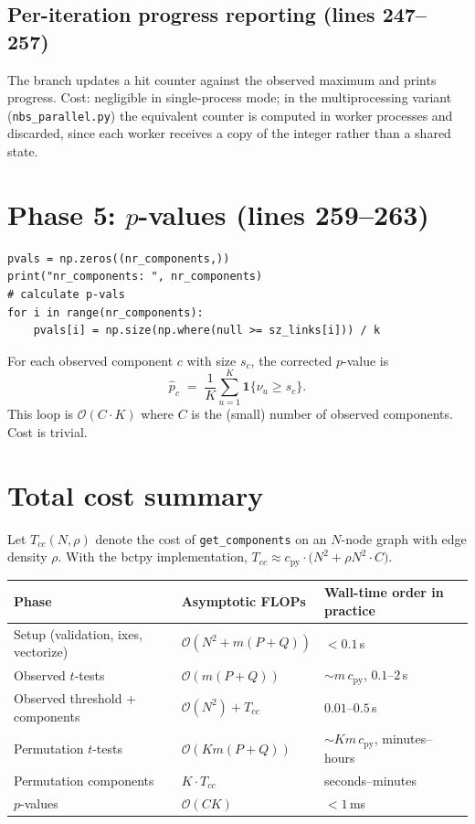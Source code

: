 \documentclass[11pt]{article}
\begin{document}
\subsection{Per-iteration progress reporting (lines 247--257)}

The branch updates a hit counter against the observed maximum and prints progress. Cost: negligible in single-process mode; in the multiprocessing variant (\texttt{nbs\_parallel.py}) the equivalent counter is computed in worker processes and discarded, since each worker receives a copy of the integer rather than a shared state.

\section{Phase 5: $p$-values (lines 259--263)}

\begin{lstlisting}[firstnumber=259]
pvals = np.zeros((nr_components,))
print("nr_components: ", nr_components)
# calculate p-vals
for i in range(nr_components):
    pvals[i] = np.size(np.where(null >= sz_links[i])) / k
\end{lstlisting}

For each observed component $c$ with size $s_c$, the corrected $p$-value is
%
\begin{equation}
\hat p_c \;=\; \frac{1}{K}\sum_{u=1}^K \mathbf{1}\{\nu_u \ge s_c\}.
\label{eq:pvalue}
\end{equation}
%
This loop is $\mathcal{O}(C \cdot K)$ where $C$ is the (small) number of observed components. Cost is trivial.

\section{Total cost summary}

Let $T_{cc}(N, \rho)$ denote the cost of \texttt{get\_components} on an $N$-node graph with edge density $\rho$. With the bctpy implementation, $T_{cc} \approx c_{\textrm{py}} \cdot \bigl(N^2 + \rho N^2 \cdot C\bigr)$.

\begin{center}
\begin{tabular}{lll}
\toprule
Phase & Asymptotic FLOPs & Wall-time order in practice \\
\midrule
Setup (validation, ixes, vectorize) & $\mathcal{O}(N^2 + m(P{+}Q))$ & $< 0.1$\,s \\
Observed $t$-tests & $\mathcal{O}(m(P{+}Q))$ & $\sim m\, c_{\textrm{py}}$, $0.1$--$2$\,s \\
Observed threshold + components & $\mathcal{O}(N^2) + T_{cc}$ & $0.01$--$0.5$\,s \\
Permutation $t$-tests & $\mathcal{O}(K m (P{+}Q))$ & $\sim K m\, c_{\textrm{py}}$, minutes--hours \\
Permutation components & $K \cdot T_{cc}$ & seconds--minutes \\
$p$-values & $\mathcal{O}(C K)$ & $< 1$\,ms \\
\bottomrule
\end{tabular}
\end{center}
\end{document}
